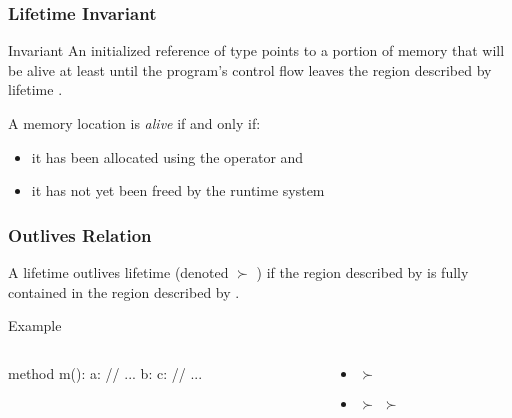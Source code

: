 \begin{frame}
	\frametitle{Lifetime Invariant}
	\begin{block}{Invariant}
		An initialized reference of type  points to a portion of memory that will be alive at least until the program's control flow leaves the region described by lifetime .
	\end{block}

	\begin{definition}[Liveness]
		A memory location is \emph{alive} if and only if:
		\begin{itemize}
			\item it has been allocated using the  operator and
			\item it has not yet been freed by the runtime system
		\end{itemize}
	\end{definition}
\end{frame}

\begin{frame}[fragile]
	\frametitle{Outlives Relation}
	\begin{definition}[Outlives]
		A lifetime  outlives lifetime  (denoted  $\succ$ ) if the region described by  is fully contained in the region described by .
	\end{definition}
	\pause
	\begin{block}{Example}
		\begin{columns}
			\begin{column}{0.45\linewidth}
\begin{whileycode}
method m():
	a:
		// ...
	b:
		c:
			// ...
\end{whileycode}
			\end{column}
			\begin{column}{0.5\linewidth}
				\pause
				\begin{itemize}
					\item {} $\succ$ 
					\item {} $\succ$  $\succ$ 
				\end{itemize}
			\end{column}
		\end{columns}
	\end{block}
\end{frame}

